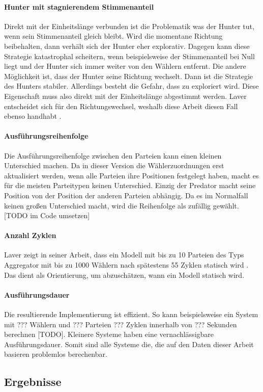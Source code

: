\paragraph{Hunter mit stagnierendem Stimmenanteil}
Direkt mit der Einheitslänge verbunden ist die Problematik was der Hunter tut, wenn sein Stimmenanteil gleich bleibt. Wird die momentane Richtung beibehalten, dann verhält sich der Hunter eher explorativ. Dagegen kann diese Strategie katastrophal scheitern, wenn beispielsweise der Stimmenanteil bei Null liegt und der Hunter sich immer weiter von den Wählern entfernt. Die andere Möglichkeit ist, dass der Hunter seine Richtung wechselt. Dann ist die Strategie des Hunters stabiler. Allerdings besteht die Gefahr, dass zu exploriert wird. Diese Eigenschaft muss also direkt mit der Einheitslänge abgestimmt werden.
Laver entscheidet sich für den Richtungswechsel, weshalb diese Arbeit diesen Fall ebenso handhabt \citep[S.\,280]{laver2005policy}.

\paragraph{Ausführungsreihenfolge}
Die Ausführungsreihenfolge zwischen den Parteien kann einen kleinen Unterschied machen. Da in dieser Version die Wählerzuordnungen erst aktualisiert werden, wenn alle Parteien ihre Positionen festgelegt haben, macht es für die meisten Parteitypen keinen Unterschied. Einzig der Predator macht seine Position von der Position der anderen Parteien abhängig. Da es im Normalfall keinen großen Unterschied macht, wird die Reihenfolge als zufällig gewählt.
[TODO im Code umsetzen]

\paragraph{Anzahl Zyklen}
Laver zeigt in seiner Arbeit, dass ein Modell mit bis zu 10 Parteien des Typs Aggregator mit bis zu 1000 Wählern nach spätestens 55 Zyklen statisch wird \cite[S.\,271-2]{laver2005policy}. Das dient als Orientierung, um abzuschätzen, wann ein Modell statisch wird.

\paragraph{Ausführungsdauer}
Die resultierende Implementierung ist effizient. So kann beispielsweise ein System mit ??? Wählern und ??? Parteien ??? Zyklen innerhalb von ??? Sekunden berechnen [TODO]. Kleinere Systeme haben eine vernachlässigbare Ausführungsdauer. Somit sind alle Systeme die, die auf den Daten dieser Arbeit basieren problemlos berechenbar.

\subsection{Ergebnisse}

\blindtext[4]
